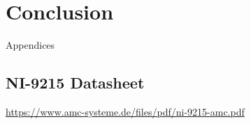 \documentclass{article}
\begin{document}
\section{Conclusion}

\newpage
\thispagestyle{empty}  %
\begin{center}
	\vspace*{\fill}
	{\Huge Appendices}
	\vspace*{\fill}
\end{center}

\newpage
\begin{appendices}
\pagestyle{fancy}
\renewcommand{\thefigure}{A\arabic{figure}}
\setcounter{figure}{0}


\section*{NI-9215 Datasheet}
\url{https://www.amc-systeme.de/files/pdf/ni-9215-amc.pdf}

\end{appendices}
\end{document}
